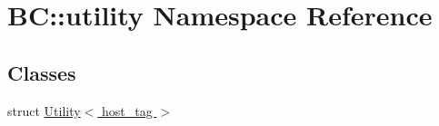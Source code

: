 \hypertarget{namespaceBC_1_1utility}{}\section{BC\+:\+:utility Namespace Reference}
\label{namespaceBC_1_1utility}
\subsection*{Classes}
\begin{DoxyCompactItemize}
\item 
struct \hyperlink{structBC_1_1utility_1_1Utility_3_01host__tag_01_4}{Utility$<$ host\+\_\+tag $>$}
\end{DoxyCompactItemize}
